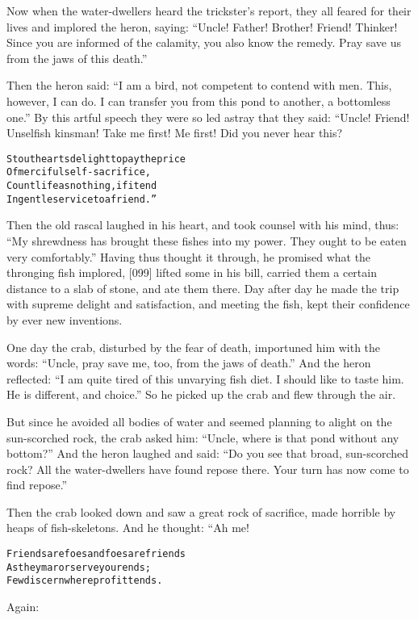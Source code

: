 \documentclass{article}
\renewenvironment{verbatim}{\begin{alltt}\normalfont\begin{centering}}{\end{centering}\end{alltt}}
\begin{document}
Now when the water-dwellers heard the trickster's report, they all
feared for their lives and implored the heron, saying:
``Uncle! Father! Brother! Friend! Thinker! Since you are informed of the calamity, you also know the remedy. Pray save us from the jaws of this death.''

Then the heron said:
``I am a bird, not competent to contend with men. This, however, I can do. I can transfer you from this pond to another, a bottomless one.''
By this artful speech they were so led astray that they said:
“Uncle! Friend! Unselfish kinsman! Take me first! Me first! Did you
never hear this?

\begin{verbatim}
Stout hearts delight to pay the price
Of merciful self-sacrifice,
Count life as nothing, if it end
In gentle service to a friend.”
\end{verbatim}
Then the old rascal laughed in his heart, and took counsel with his
mind, thus:
``My shrewdness has brought these fishes into my power. They ought to be eaten very comfortably.''
Having thus thought it through, he promised what the thronging fish
implored, [099] lifted some in his bill, carried them a certain
distance to a slab of stone, and ate them there. Day after day he
made the trip with supreme delight and satisfaction, and meeting
the fish, kept their confidence by ever new inventions.

One day the crab, disturbed by the fear of death, importuned him
with the words:
``Uncle, pray save me, too, from the jaws of death.'' And the heron
reflected:
``I am quite tired of this unvarying fish diet. I should like to taste him. He is different, and choice.''
So he picked up the crab and flew through the air.

But since he avoided all bodies of water and seemed planning to
alight on the sun-scorched rock, the crab asked him:
``Uncle, where is that pond without any bottom?'' And the heron
laughed and said:
``Do you see that broad, sun-scorched rock? All the water-dwellers have found repose there. Your turn has now come to find repose.''

Then the crab looked down and saw a great rock of sacrifice, made
horrible by heaps of fish-skeletons. And he thought: “Ah me!

\begin{verbatim}
Friends are foes and foes are friends
As they mar or serve your ends;
Few discern where profit tends.
\end{verbatim}
Again:
\end{document}
